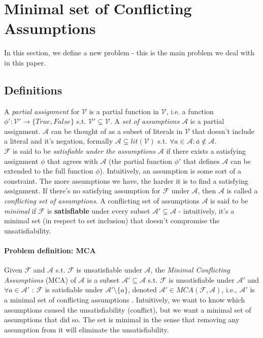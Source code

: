\documentclass[]{article}
\begin{document}
	\pagebreak
	\section{Minimal set of Conflicting Assumptions}

	In this section, we define a new problem - this is the main problem we deal with in this paper.
	\subsection{Definitions} A \textit{partial assignment} for $ \mathcal{V} $ is a partial function in $ \mathcal{V} $, i.e. a function $ \phi' : \mathcal{V}' \rightarrow \{True, False\} $ s.t. $\mathcal{V}' \subsetneq \mathcal{V}$. A \textit{set of assumptions} $ \mathcal{A} $ is a partial assignment. $ \mathcal{A} $ can be thought of as a subset of literals in $\mathcal{V}$ that doesn't include a literal and it's negation, formally $ \mathcal{A} \subsetneq lit(\mathcal{V}) $ s.t. $ \forall a \in \mathcal{A} : \bar{a} \notin \mathcal{A} $.\\
	$ \mathcal{F} $ is said to be \textit{satisfiable under the assumptions} $ \mathcal{A} $ if there exists a satisfying assignment $ \phi $ that agrees with $ \mathcal{A} $ (the partial function $ \phi' $ that defines $ \mathcal{A} $ can be extended to the full function $ \phi $). Intuitively, an assumption is some sort of a constraint. The more assumptions we have, the harder it is to find a satisfying assignment. If there's no satisfying assumption for $ \mathcal{F} $ under $ \mathcal{A} $, then $ \mathcal{A} $ is called a \textit{conflicting set of assumptions}. A conflicting set of assumptions  $ \mathcal{A} $ is said to be \textit{minimal} if $ \mathcal{F} $ is \textbf{satisfiable} under every subset  $ \mathcal{A'} \subsetneq \mathcal{A} $ - intuitively, it's a minimal set (in respect to set inclusion) that doesn't compromise the unsatisfiability.
	\paragraph{Problem definition: MCA} Given $ \mathcal{F} $ and $ \mathcal{A} $ s.t. $ \mathcal{F} $ is unsatisfiable under $ \mathcal{A} $, the \textit{Minimal Conflicting Assumptions} (MCA) of $ \mathcal{A} $ is a subset $ \mathcal{A}' \subseteq \mathcal{A} $ s.t. $ \mathcal{F} $ is unsatisfiable under $ \mathcal{A}' $ and $ \forall a \in \mathcal{A}' $ : $ \mathcal{F} $ is satisfiable under $ \mathcal{A}' \setminus \{a\} $, denoted $ \mathcal{A}' \in MCA(\mathcal{F},\mathcal{A}) $, i.e., $ \mathcal{A}' $ is a minimal set of conflicting assumptions . Intuitively, we want to know which assumptions caused the unsatisfiability (conflict), but we want a minimal set of assumptions that did so. The set is minimal in the sense that removing any assumption from it will eliminate the unsatisfiability.\\
\end{document}
